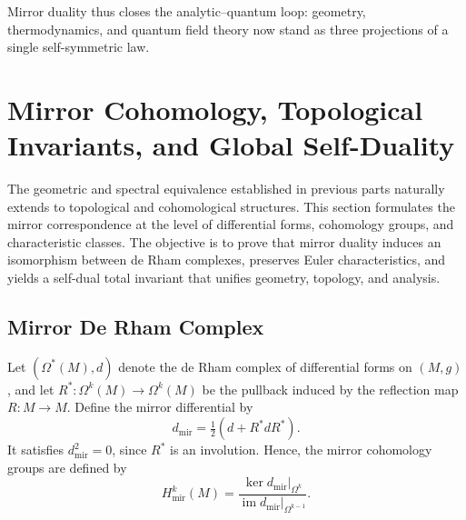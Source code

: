Mirror duality thus closes the analytic–quantum loop:
geometry, thermodynamics, and quantum field theory
now stand as three projections of a single self-symmetric law.


\section{Mirror Cohomology, Topological Invariants, and Global Self-Duality}\relax \hspace{0pt}

The geometric and spectral equivalence established in previous parts
naturally extends to topological and cohomological structures.
This section formulates the mirror correspondence
at the level of differential forms, cohomology groups, and characteristic classes.
The objective is to prove that
mirror duality induces an isomorphism between de Rham complexes,
preserves Euler characteristics, and yields a self-dual total invariant
that unifies geometry, topology, and analysis.

\subsection{Mirror De Rham Complex}\relax \hspace{0pt}

Let \((\Omega^{*}(M),d)\) denote the de Rham complex of differential forms
on \((M,g)\),
and let \(R^{*}:\Omega^{k}(M)\to\Omega^{k}(M)\)
be the pullback induced by the reflection map \(R:M\to M\).
Define the mirror differential by
\[
d_{\mathrm{mir}}
=\tfrac{1}{2}(d+R^{*}dR^{*}).
\]
It satisfies \(d_{\mathrm{mir}}^{2}=0\),
since \(R^{*}\) is an involution.
Hence, the mirror cohomology groups are defined by
\[
H_{\mathrm{mir}}^{k}(M)
=\frac{\ker d_{\mathrm{mir}}|_{\Omega^{k}}}
{\operatorname{im} d_{\mathrm{mir}}|_{\Omega^{k-1}}}.
\]

